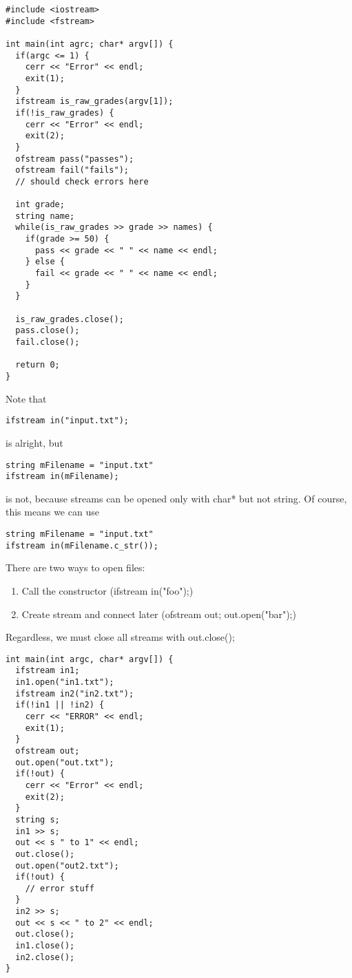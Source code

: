 \documentclass[12pt]{article}
\begin{document}
\begin{verbatim}
#include <iostream>
#include <fstream>

int main(int agrc; char* argv[]) {
  if(argc <= 1) {
    cerr << "Error" << endl;
    exit(1);
  }
  ifstream is_raw_grades(argv[1]);
  if(!is_raw_grades) {
    cerr << "Error" << endl;
    exit(2);
  }
  ofstream pass("passes");
  ofstream fail("fails");
  // should check errors here
  
  int grade;
  string name;
  while(is_raw_grades >> grade >> names) {
    if(grade >= 50) {
      pass << grade << " " << name << endl;
    } else {
      fail << grade << " " << name << endl;
    }
  }
  
  is_raw_grades.close();
  pass.close();
  fail.close();
  
  return 0;
}
\end{verbatim}

Note that
\begin{verbatim}
ifstream in("input.txt");
\end{verbatim}
is alright, but
\begin{verbatim}
string mFilename = "input.txt"
ifstream in(mFilename);
\end{verbatim}
is not, because streams can be opened only with char* but not string. Of course, this means we can use
\begin{verbatim}
string mFilename = "input.txt"
ifstream in(mFilename.c_str());
\end{verbatim}

There are two ways to open files:
\begin{enumerate}
\item Call the constructor (ifstream in("foo");)
\item Create stream and connect later (ofstream out; out.open("bar");)
\end{enumerate}

Regardless, we must close all streams with out.close();

\begin{verbatim}
int main(int argc, char* argv[]) {
  ifstream in1;
  in1.open("in1.txt");
  ifstream in2("in2.txt");
  if(!in1 || !in2) {
    cerr << "ERROR" << endl;
    exit(1);
  }
  ofstream out;
  out.open("out.txt");
  if(!out) {
    cerr << "Error" << endl;
    exit(2);
  }
  string s;
  in1 >> s;
  out << s " to 1" << endl;
  out.close();
  out.open("out2.txt");
  if(!out) {
    // error stuff
  }
  in2 >> s;
  out << s << " to 2" << endl;
  out.close();
  in1.close();
  in2.close();
}
\end{verbatim}
\end{document}
